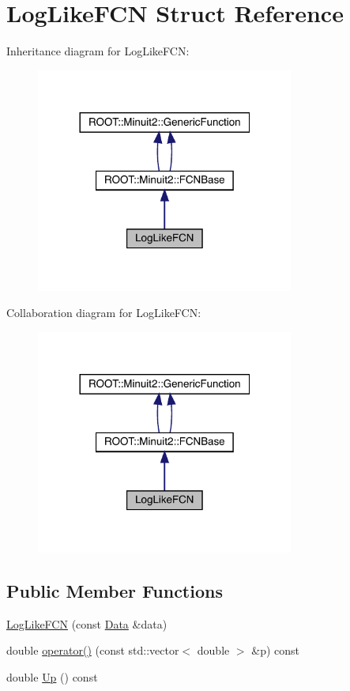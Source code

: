 \hypertarget{structLogLikeFCN}{}\section{Log\+Like\+F\+CN Struct Reference}
\label{structLogLikeFCN}


Inheritance diagram for Log\+Like\+F\+CN\+:\nopagebreak
\begin{figure}[H]
\begin{center}
\leavevmode
\includegraphics[width=240pt]{d6/d76/structLogLikeFCN__inherit__graph}
\end{center}
\end{figure}


Collaboration diagram for Log\+Like\+F\+CN\+:\nopagebreak
\begin{figure}[H]
\begin{center}
\leavevmode
\includegraphics[width=240pt]{d9/dbb/structLogLikeFCN__coll__graph}
\end{center}
\end{figure}
\subsection*{Public Member Functions}
\begin{DoxyCompactItemize}
\item 
\mbox{\hyperlink{structLogLikeFCN_a45401253d941b65211285bef93b74c59}{Log\+Like\+F\+CN}} (const \mbox{\hyperlink{ParallelTest_8cxx_a1766b42441c3f4d78bb2b56263a8e058}{Data}} \&data)
\item 
double \mbox{\hyperlink{structLogLikeFCN_a22d42d405147ecea23ab7b3a61003179}{operator()}} (const std\+::vector$<$ double $>$ \&p) const
\item 
double \mbox{\hyperlink{structLogLikeFCN_ace81f647c3b49597fdfa5a9ff88e56d4}{Up}} () const
\end{DoxyCompactItemize}
